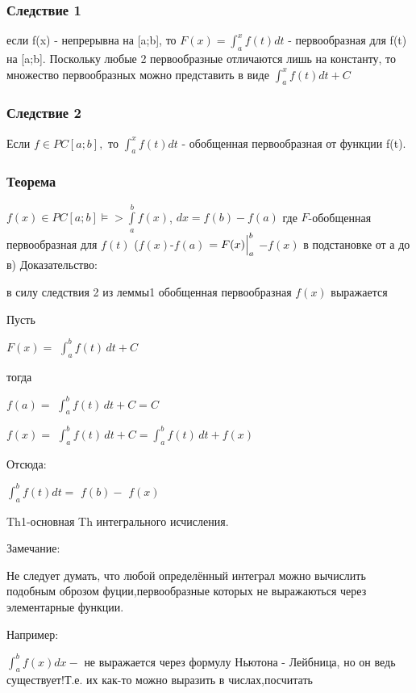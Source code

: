 \subsubsection{Следствие 1}
если f(x) - непрерывна на [a;b], то $F(x)=\int_{a}^{x}f(t)dt$ - первообразная для f(t) на [a;b]. Поскольку любые 2 первообразные отличаются лишь на константу, то множество первообразных можно представить в виде $\int_{a}^{x}f(t)dt+C$

\subsubsection{Следствие 2}
Если $f\in PC[a;b],$ то $\int_{a}^{x}f(t)dt$ - обобщенная первообразная от функции f(t).

\subsubsection{Теорема}
$ f(x) \in PC[a;b]\models>\int\limits_a^b f(x)$, $dx= f(b)- f(a) $
где $F$-обобщенная первообразная для $f(t)$
($ f(x)$-$f(a)$ $= \Bigl. F(x) \Bigr|_a^b$
$-f(x)$ в подстановке от а до в)
Доказательство:

в силу следствия 2 из леммы1 обобщенная первообразная $ f(x)$ выражается

Пусть

$ F(x)= $ $\int_a^b f(t)\,dt+C$ 

тогда

$ f(a)= $ $\int_a^b f(t)\,dt+C=C$

$f(x)=$ $\int_a^b f(t)\,dt+C=$$\int_a^b f(t)\,dt+$$f(x)$ 

Отсюда:

$\int_a^b f(t) dt = $ $f(b)-$ $f(x)$

Th1-основная Th интегрального исчисления.

Замечание:

Не следует думать, что любой определённый интеграл можно вычислить подобным оброзом фуции,первообразные которых не выражаються через элементарные функции.

Например:

$\int_a^b f(x) dx-$
не выражается через формулу Ньютона - Лейбница, но он ведь существует!Т.е. их как-то можно выразить в числах,посчитать
 